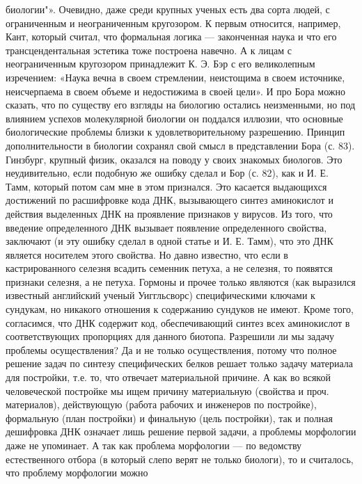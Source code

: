 биологии"». Очевидно, даже среди крупных  ученых есть два сорта людей,
с  ограниченным  и  неограниченным  кругозором.  К  первым  относится,
например, Кант, который считал,  что формальная логика --- законченная
наука и что его трансцендентальная  эстетика тоже построена навечно. А
к  лицам с  неограниченным  кругозором  принадлежит К.  Э.  Бэр с  его
великолепным изречением: «Наука вечна в своем стремлении, неистощима в
своем источнике,  неисчерпаема в  своем объеме  и недостижима  в своей
цели».  И про  Бора  можно сказать,  что по  существу  его взгляды  на
биологию остались  неизменными, но  под влиянием  успехов молекулярной
биологии  он поддался  иллюзии,  что  основные биологические  проблемы
близки  к удовлетворительному  разрешению. Принцип  дополнительности в
биологии сохранял свой  смысл в представлении Бора  (с. 83). Гинзбург,
крупный  физик, оказался  на  поводу у  своих  знакомых биологов.  Это
неудивительно, если подобную же ошибку сделал  и Бор (с. 82), как и И.
Е.  Тамм,  который  потом  сам  мне в  этом  признался.  Это  касается
выдающихся  достижений по  расшифровке  кода  ДНК, вызывающего  синтез
аминокислот  и  действия  выделенных  ДНК на  проявление  признаков  у
вирусов. Из  того, что  введение определенного ДНК  вызывает появление
определенного свойства, заключают (и эту  ошибку сделал в одной статье
и И. Е. Тамм), что это ДНК является носителем этого свойства. Но давно
известно, что если в  кастрированного селезня всадить семенник петуха,
а не  селезня, то появятся  признаки селезня,  а не петуха.  Гормоны и
прочее  только являются  (как  выразился  известный английский  ученый
Уиггльсворс) специфическими ключами к  сундукам, но никакого отношения
к  содержанию  сундуков не  имеют.  Кроме  того, согласимся,  что  ДНК
содержит код, обеспечивающий синтез всех аминокислот в соответствующих
пропорциях  для  данного  биотопа.  Разрешили ли  мы  задачу  проблемы
осуществления? Да и не только осуществления, потому что полное решение
задач по  синтезу специфических белков решает  только задачу материала
для постройки,  т.е. то, что  отвечает материальной причине. А  как во
всякой человеческой  постройке мы ищем причину  материальную (свойства
и  проч.  материалов),  действующую  (работа рабочих  и  инженеров  по
постройке), формальную (план постройки)  и финальную (цель постройки),
так и  полная дешифровка  ДНК означает лишь  решение первой  задачи, а
проблемы морфологии даже  не упоминает. А так  как проблема морфологии
---  по  ведомству естественного  отбора  (в  который слепо  верят  не
только  биологи),  то  и  считалось,  что  проблему  морфологии  можно
